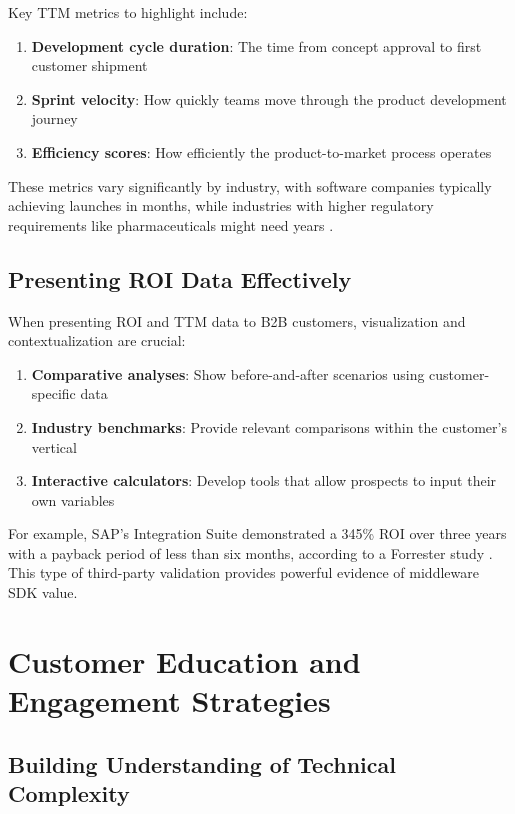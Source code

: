 \documentclass[11pt,a4paper]{article}
\begin{document}
Key TTM metrics to highlight include:

\begin{enumerate}
    \item \textbf{Development cycle duration}: The time from concept approval to first customer shipment
    \item \textbf{Sprint velocity}: How quickly teams move through the product development journey
    \item \textbf{Efficiency scores}: How efficiently the product-to-market process operates
\end{enumerate}

These metrics vary significantly by industry, with software companies typically achieving launches in months, while industries with higher regulatory requirements like pharmaceuticals might need years \citep{kleshchuk2021timetomarket}.

\subsection{Presenting ROI Data Effectively}

When presenting ROI and TTM data to B2B customers, visualization and contextualization are crucial:

\begin{enumerate}
    \item \textbf{Comparative analyses}: Show before-and-after scenarios using customer-specific data
    \item \textbf{Industry benchmarks}: Provide relevant comparisons within the customer's vertical
    \item \textbf{Interactive calculators}: Develop tools that allow prospects to input their own variables
\end{enumerate}

For example, SAP's Integration Suite demonstrated a 345\% ROI over three years with a payback period of less than six months, according to a Forrester study \citep{Sandhu2024}. This type of third-party validation provides powerful evidence of middleware SDK value.

\section{Customer Education and Engagement Strategies}

\subsection{Building Understanding of Technical Complexity}
\end{document}
